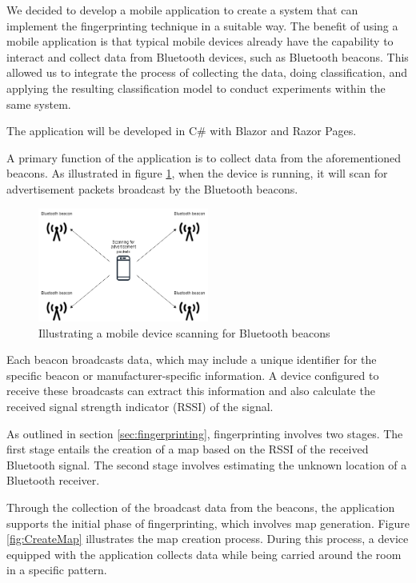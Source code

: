 We decided to develop a mobile application to create a system that can implement the fingerprinting technique in a suitable way.
The benefit of using a mobile application is that typical mobile devices already have the capability to interact and collect data from Bluetooth devices, such as Bluetooth beacons. 
This allowed us to integrate the process of collecting the data, doing classification, and applying the resulting classification model to conduct experiments within the same system.

The application will be developed in C\#\cite{billwagnerDocsGetStarted} with Blazor\cite{BlazorBuildClient} and Razor Pages\cite{tdykstraIntroductionRazorPages2023}.

A primary function of the application is to collect data from the aforementioned beacons. 
As illustrated in figure \ref{fig:ScanAdvertisement}, when the device is running, it will scan for advertisement packets broadcast by the Bluetooth beacons.

\begin{figure}[H]
    \centering
    \includegraphics[width=0.5\textwidth]{images/ScanningForAdvertisement.drawio.png}
    \caption{Illustrating a mobile device scanning for Bluetooth beacons}
    \label{fig:ScanAdvertisement}
\end{figure}

Each beacon broadcasts data, which may include a unique identifier for the specific beacon or manufacturer-specific information.
A device configured to receive these broadcasts can extract this information and also calculate the received signal strength indicator (RSSI) of the signal.

As outlined in section \ref{sec:fingerprinting}, fingerprinting involves two stages.
The first stage entails the creation of a map based on the RSSI of the received Bluetooth signal. The second stage involves estimating the unknown location of a Bluetooth receiver.

Through the collection of the broadcast data from the beacons, the application supports the initial phase of fingerprinting, which involves map generation.
Figure \ref{fig:CreateMap} illustrates the map creation process. During this process, a device equipped with the application collects data while being carried around the room in a specific pattern.

